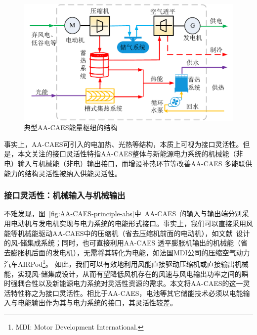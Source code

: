 \begin{figure}[H] %
  \centering
  \includegraphics[scale=0.50]{figures/Chap1-3-ST-CAES-Hub.pdf}
  \caption{典型AA-CAES能量枢纽的结构}
  \label{fig:ST-CAES-Hub}
\end{figure}

事实上，AA-CAES可引入的电加热、光热等结构，本质上可视为接口灵活性。但是，本文关注的接口灵活性特指AA-CAES整体与新能源电力系统的机械能（非电）输入与机械能（非电）输出接口，而增设补热环节等改善AA-CAES 多能联供能力的结构灵活性被纳入供能灵活性。

\subsubsection{接口灵活性：机械输入与机械输出}
不难发现，图~\ref{fig:AA-CAES-principle-abs}中~AA-CAES~的输入与输出端分别采用电动机与发电机实现与电力系统的电能形式接口。事实上，我们可以直接采用风能等机械能驱动AA-CAES中的压缩机（省去压缩机前面的电动机），如文献~设计的风-储集成系统；同时，也可直接利用AA-CAES 透平膨胀机输出的机械能（省去膨胀机后面的发电机），无需将其转化为电能，如法国MDI公司的压缩空气动力汽车AIRPod\footnote{MDI: Motor Development International.}。 如此，我们可以有效地利用风能直接驱动压缩机或直接输出机械能，实现风-储集成设计，从而有望降低风机存在的风速与风电输出功率之间的瞬时强耦合性以及新能源电力系统对灵活性资源的需求。本文将AA-CAES的这一灵活特性称之为接口灵活性。相比于AA-CAES，电池等其它储能技术必须以电能输入与电能输出作为其与电力系统的接口，其灵活性较差。

